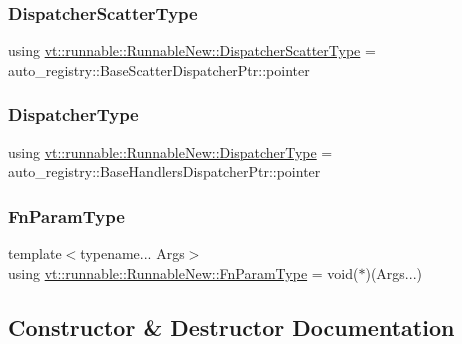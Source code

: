 \subsubsection{\texorpdfstring{Dispatcher\+Scatter\+Type}{DispatcherScatterType}}
{\footnotesize\ttfamily using \hyperlink{structvt_1_1runnable_1_1_runnable_new_a1e5173d3a71a30f4901c61b7de4092c6}{vt\+::runnable\+::\+Runnable\+New\+::\+Dispatcher\+Scatter\+Type} =  auto\+\_\+registry\+::\+Base\+Scatter\+Dispatcher\+Ptr\+::pointer}

\mbox{\label{structvt_1_1runnable_1_1_runnable_new_ad0cb55d8e34960ef9dd139638cb721cd}} 
\subsubsection{\texorpdfstring{Dispatcher\+Type}{DispatcherType}}
{\footnotesize\ttfamily using \hyperlink{structvt_1_1runnable_1_1_runnable_new_ad0cb55d8e34960ef9dd139638cb721cd}{vt\+::runnable\+::\+Runnable\+New\+::\+Dispatcher\+Type} =  auto\+\_\+registry\+::\+Base\+Handlers\+Dispatcher\+Ptr\+::pointer}

\mbox{\label{structvt_1_1runnable_1_1_runnable_new_a591a5eaee30eea99711e14e050633d34}} 
\subsubsection{\texorpdfstring{Fn\+Param\+Type}{FnParamType}}
{\footnotesize\ttfamily template$<$typename... Args$>$ \\
using \hyperlink{structvt_1_1runnable_1_1_runnable_new_a591a5eaee30eea99711e14e050633d34}{vt\+::runnable\+::\+Runnable\+New\+::\+Fn\+Param\+Type} =  void($\ast$)(Args...)}



\subsection{Constructor \& Destructor Documentation}
\mbox{\label{structvt_1_1runnable_1_1_runnable_new_a47b84af69a5444b9d837a3ffe4d4792b}} 
